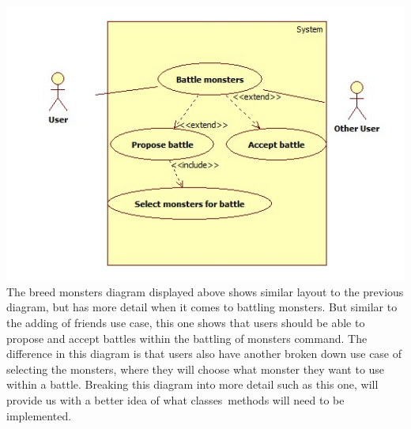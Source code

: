 \documentclass[a4paper]{article}
\begin{document}
\begin{center}
\includegraphics[width=\textwidth]{img/UseCaseBattle.jpg}
The breed monsters diagram displayed above shows similar layout to the previous diagram, but has more detail when it comes to battling monsters. But similar to the adding of friends use case, this one shows that users should be able to propose and accept battles within the battling of monsters command. The difference in this diagram is that users also have another broken down use case of selecting the monsters, where they will choose what monster they want to use within a battle. Breaking this diagram into more detail such as this one, will provide us with a better idea of what classes\ methods will need to be implemented.


\end{center}
\end{document}
